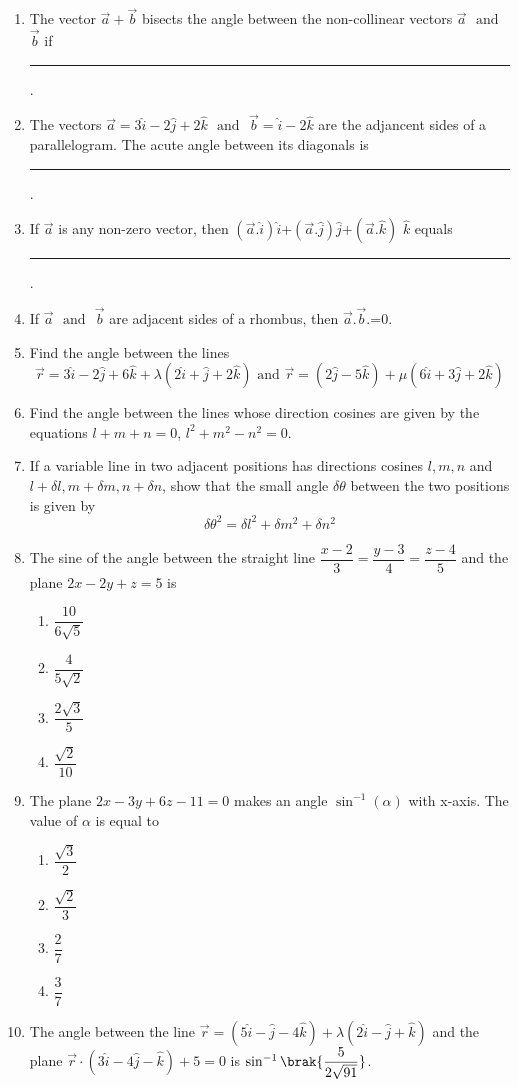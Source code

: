 \begin{enumerate}[label=\thesection.\arabic*,ref=\thesection.\theenumi]
\item The vector $\vec{a}+\vec{b}$ bisects the angle between the non-collinear vectors $\vec{a}$ $\text{ and }$ $\vec{b}$ if \rule{1cm}{0.15mm}.
\item The vectors $\vec{a}=3\hat{i}-2\hat{j}+2\hat{k}$ $\text{ and }$ $\vec{b}=\hat{i}-2\hat{k}$ are the adjancent sides of a parallelogram. The acute angle between its diagonals is \rule{1cm}{0.15mm}.
\item If $\vec{a}$ is  any non-zero vector, then $(\vec{a}.\hat{i})\hat{i}$+$(\vec{a}.\hat{j})\hat{j}$+$(\vec{a}.\hat{k})$ $\hat{k}$ equals \rule{1cm}{0.15mm}.
\item If $\vec{a}$ $\text{ and }$ $\vec{b}$ are adjacent sides of a rhombus, then $\vec{a}.\vec{b}$.=0.
\item Find the angle between the lines $$\overrightarrow{r}=3\hat{i}-2\hat{j}+6\hat{k}+\lambda(2\hat{i}+\hat{j}+2\hat{k})\text{ and } \overrightarrow{r}=(2\hat{j}-5\hat{k})+\mu(6\hat{i}+3\hat{j}+2\hat{k})$$
\item Find the angle between the lines whose direction cosines are given by the equations $l+m+n=0$, $l^2+m^2-n^2=0$.
\item If a variable line in two adjacent positions has directions cosines $l, m, n$ and $l+\delta l, m+\delta m, n+\delta n$, show that the small angle $\delta\theta$ between the two positions is given by $$\delta\theta^2=\delta l^2+\delta m^2+\delta n^2$$ 
\item The sine of the angle between the straight line $\dfrac{x-2}{3}=\dfrac{y-3}{4}=\dfrac{z-4}{5}$ and the plane $2x-2y+z=5$ is
\begin{enumerate}
	\item $\dfrac{10}{6\sqrt{5}}$ 
	\item $\dfrac{4}{5\sqrt{2}}$
	\item $\dfrac{2\sqrt{3}}{5}$
	\item $\dfrac{\sqrt{2}}{10}$
\end{enumerate}
\item The plane $2x-3y+6z-11=0$ makes an angle $\sin^{-1}(\alpha)$ with x-axis. The value of $\alpha$ is equal to 
\begin{enumerate}
	\item  $\dfrac{\sqrt{3}}{2}$
	\item  $\dfrac{\sqrt{2}}{3}$
	\item  $\dfrac{2}{7}$
	\item  $\dfrac{3}{7}$
\end{enumerate}
\item The angle between the line $\overrightarrow{r}=(5\hat{i}-\hat{j}-4\hat{k})+\lambda(2\hat{i}-\hat{j}+\hat{k})$ and the plane $\overrightarrow{r} \cdot (3\hat{i}-4\hat{j}-\hat{k})+5=0$ is $\sin^{-1}\brak{\dfrac{5}{2\sqrt{91}}}$.

\end{enumerate}

